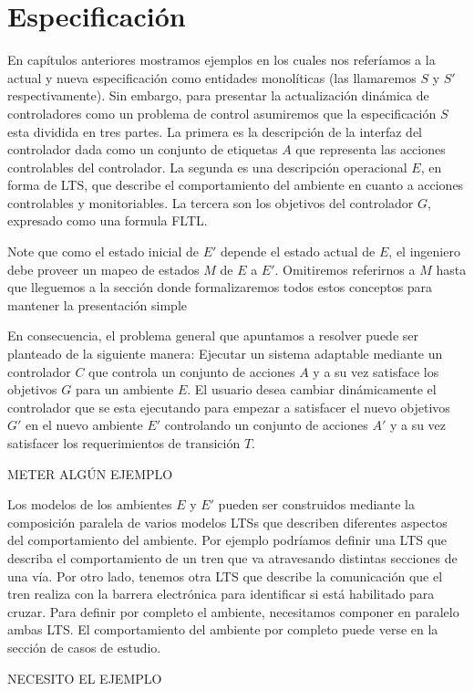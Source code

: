 \section{Especificación}

En capítulos anteriores mostramos ejemplos en los cuales nos referíamos a la actual y nueva especificación como
entidades monolíticas (las llamaremos $S$ y $S'$ respectivamente). Sin embargo, para presentar la actualización dinámica
de controladores como un problema de control asumiremos que la especificación $S$ esta dividida en tres partes. La
primera es la descripción de la interfaz del controlador dada como un conjunto de etiquetas $A$ que representa las
acciones controlables del controlador. La segunda es una descripción operacional $E$, en forma de LTS, que describe el
comportamiento del ambiente en cuanto a acciones controlables y monitoriables. La tercera son los objetivos del
controlador $G$, expresado como una formula FLTL.

Note que como el estado inicial de $E'$ depende el estado actual de $E$, el ingeniero debe proveer un mapeo de estados
$M$ de $E$ a $E'$. Omitiremos referirnos a $M$ hasta que lleguemos a la sección donde formalizaremos todos estos
conceptos para mantener la presentación simple

En consecuencia, el problema general que apuntamos a resolver puede ser planteado de la siguiente manera: Ejecutar
un sistema adaptable mediante un controlador $C$ que controla un conjunto de acciones $A$ y a su vez satisface los
objetivos $G$ para un ambiente $E$. El usuario desea cambiar dinámicamente el controlador que se esta ejecutando para
empezar a satisfacer el nuevo objetivos $G'$ en el nuevo ambiente $E'$ controlando un conjunto de acciones $A'$ y a su
vez satisfacer los requerimientos de transición $T$.

METER ALGÚN EJEMPLO

Los modelos de los ambientes $E$ y $E'$ pueden ser construidos mediante la composición paralela de varios modelos LTSs
que describen diferentes aspectos del comportamiento del ambiente. Por ejemplo podríamos definir una LTS que describa el
comportamiento de un tren que va atravesando distintas secciones de una vía. Por otro lado, tenemos otra LTS que
describe la comunicación que el tren realiza con la barrera electrónica para identificar si está habilitado para cruzar.
Para definir por completo el ambiente, necesitamos componer en paralelo ambas LTS. El comportamiento del ambiente por
completo puede verse en la sección de casos de estudio.

NECESITO EL EJEMPLO
